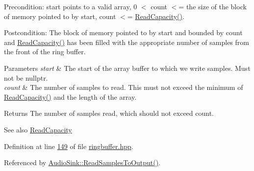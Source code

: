 \begin{DoxyItemize}
\item Precondition\+: start points to a valid array, 0 $<$ count $<$= the size of the block of memory pointed to by start, count $<$= \hyperlink{classRingBuffer_a7086cc66306105db205842af7a88c2d8}{Read\+Capacity()}.
\item Postcondition\+: The block of memory pointed to by start and bounded by count and \hyperlink{classRingBuffer_a7086cc66306105db205842af7a88c2d8}{Read\+Capacity()} has been filled with the appropriate number of samples from the front of the ring buffer.
\end{DoxyItemize}


\begin{DoxyParams}{Parameters}
{\em start} & The start of the array buffer to which we write samples. Must not be nullptr. \\
\hline
{\em count} & The number of samples to read. This must not exceed the minimum of \hyperlink{classRingBuffer_a7086cc66306105db205842af7a88c2d8}{Read\+Capacity()} and the length of the array. \\
\hline
\end{DoxyParams}
\begin{DoxyReturn}{Returns}
The number of samples read, which should not exceed count. 
\end{DoxyReturn}
\begin{DoxySeeAlso}{See also}
\hyperlink{classRingBuffer_a7086cc66306105db205842af7a88c2d8}{Read\+Capacity} 
\end{DoxySeeAlso}


Definition at line \hyperlink{ringbuffer_8hpp_source_l00149}{149} of file \hyperlink{ringbuffer_8hpp_source}{ringbuffer.\+hpp}.



Referenced by \hyperlink{audio__sink_8cpp_source_l00176}{Audio\+Sink\+::\+Read\+Samples\+To\+Output()}.


